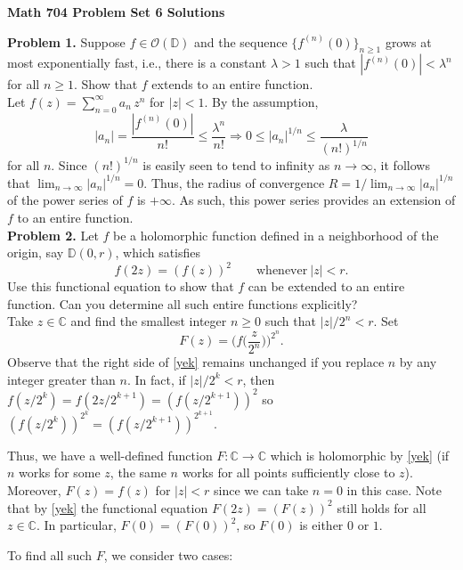 \documentclass[12pt]{amsart}
\newcommand{\OO}{{\mathcal O}}
\newcommand{\CC}{{\mathbb C}}
\newcommand{\DD}{{\mathbb D}}
\newcommand{\vs}{\vspace{2mm}}
\begin{document}
\begin{center}
{\bf \large Math 704 Problem Set 6 Solutions} \vs 
\end{center}

\noindent
{\bf Problem 1.} Suppose $f \in \OO(\DD)$ and the sequence $\{ f^{(n)}(0) \}_{n \geq 1}$ grows at most exponentially fast, i.e., there is a constant $\lambda>1$ such that $|f^{(n)}(0)|<\lambda^n$ for all $n \geq 1$. Show that $f$ extends to an entire function. \vs \\
Let $f(z)=\sum_{n=0}^\infty a_n \, z^n$ for $|z|<1$. By the assumption,
$$
|a_n| = \frac{|f^{(n)}(0)|}{n!} \leq \frac{\lambda^n}{n!} \Longrightarrow 0 \leq |a_n|^{1/n} \leq \frac{\lambda}{(n!)^{1/n}} 
$$  
for all $n$. Since $(n!)^{1/n}$ is easily seen to tend to infinity as $n \to \infty$, it follows that $\lim_{n \to \infty} |a_n|^{1/n} =0$. Thus, the radius of convergence $R=1/\lim_{n \to \infty} |a_n|^{1/n}$ of the power series of $f$ is $+\infty$. As such, this power series provides an extension of $f$ to an entire function. \\

\noindent
{\bf Problem 2.} Let $f$ be a holomorphic function defined in a neighborhood of the origin, say $\DD(0,r)$, which satisfies
$$
f(2z)=(f(z))^2 \qquad \text{whenever} \ |z|<r.
$$
Use this functional equation to show that $f$ can be extended to an entire function. Can you determine all such entire functions explicitly? \vs \\
Take $z \in \CC$ and find the smallest integer $n \geq 0$ such that $|z|/2^n<r$. Set  
\begin{equation}\label{yek}
F(z) = \Big( f \Big( \frac{z}{2^n} \Big) \Big)^{2^n}.
\end{equation}
Observe that the right side of \eqref{yek} remains unchanged if you replace $n$ by any integer greater than $n$. In fact, if $|z|/2^k<r$, then 
$f(z/2^k)=f(2z/2^{k+1})=(f(z/2^{k+1}))^2$ so $(f(z/2^k))^{2^k}=(f(z/2^{k+1}))^{2^{k+1}}$. \vs

Thus, we have a well-defined function $F: \CC \to \CC$ which is holomorphic by \eqref{yek} (if $n$ works for some $z$, the same $n$ works for all points sufficiently close to $z$). Moreover, $F(z)=f(z)$ for $|z|<r$ since we can take $n=0$ in this case. Note that by \eqref{yek} the functional equation $F(2z)=(F(z))^2$ still holds for all $z \in \CC$. In particular, $F(0)=(F(0))^2$, so $F(0)$ is either $0$ or $1$. \vs

To find all such $F$, we consider two cases: \vs
\end{document}
